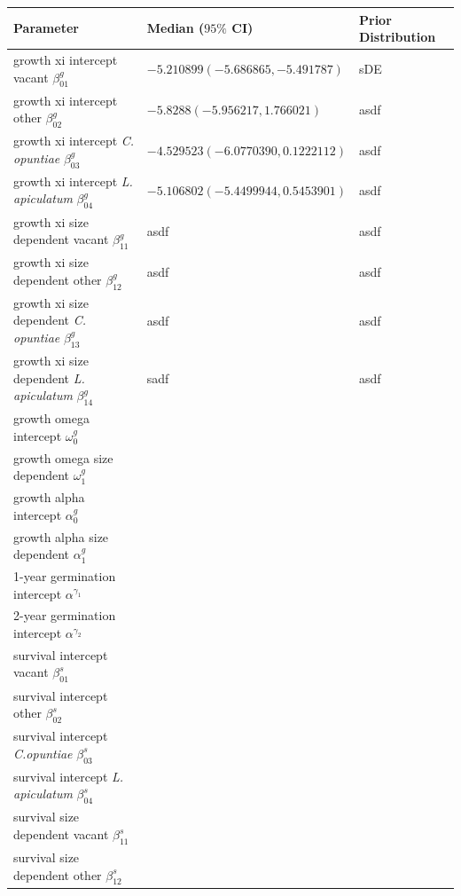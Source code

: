 \documentclass[11pt]{article}
\begin{document}
  \begin{table}[]
  \begin{tabular}{l|l|l}
    \textbf{Parameter} & \textbf{Median ($95\%$ CI)} & \textbf{Prior Distribution} \\
    \hline
    growth xi intercept vacant $\beta_{01}^g$ & $-5.210899 (-5.686865, -5.491787)$ & sDE\\
    growth xi intercept other $\beta_{02}^g$ & $-5.8288 (-5.956217, 1.766021) $&asdf \\
    growth xi intercept \textit{C. opuntiae} $\beta_{03}^g$ & $-4.529523 (-6.0770390, 0.1222112)$ & asdf\\
    growth xi intercept \textit{L. apiculatum} $\beta_{04}^g$ & $-5.106802 (-5.4499944, 0.5453901)$ & asdf\\
    growth xi size dependent vacant $\beta_{11}^g$ & asdf&asdf \\
    growth xi size dependent other $\beta_{12}^g$ & asdf&asdf \\
    growth xi size dependent \textit{C. opuntiae} $\beta_{13}^g$ & asdf&asdf \\
    growth xi size dependent \textit{L. apiculatum} $\beta_{14}^g$ &sadf &asdf \\
    growth omega intercept $\omega_0^g$ & & \\
    growth omega size dependent $\omega_1^g$ & & \\
    growth alpha intercept $\alpha_0^g$ & & \\
    growth alpha size dependent $\alpha_1^g$ & & \\
    \hline
    1-year germination intercept $\alpha^{\gamma_1}$ & & \\
    2-year germination intercept $\alpha^{\gamma_2}$ & & \\
    \hline
    survival intercept vacant $\beta_{01}^s$ & & \\
    survival intercept other $\beta_{02}^s$ & & \\
    survival intercept \textit{C.opuntiae} $\beta_{03}^s$ & & \\
    survival intercept \textit{L. apiculatum} $\beta_{04}^s$ & & \\
    survival size dependent vacant $\beta_{11}^s$ & & \\
    survival size dependent other $\beta_{12}^s$ & & \\

\end{tabular}
\end{table}
\end{document}
